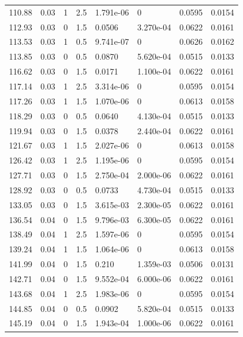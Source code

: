 \documentclass[preview]{standalone}
\begin{document}
{{{\begin{tabular}{L{1.2cm}C{1.2cm} C{0.3cm}C{0.5cm} C{1.4cm}C{1.4cm} C{1.4cm}C{1.4cm}}
  110.88  &  0.03  & 1     & 2.5 &  1.791e-06  & 0  & 0.0595 &  0.0154   \\ 
  112.93  &  0.03  & 0     & 1.5 &  0.0506  & 3.270e-04  & 0.0622 &  0.0161   \\ 
  113.53  &  0.03  & 1     & 0.5 &  9.741e-07  & 0  & 0.0626 &  0.0162   \\ 
  113.85  &  0.03  & 0     & 0.5 &  0.0870  & 5.620e-04  & 0.0515 &  0.0133   \\ 
  116.62  &  0.03  & 0     & 1.5 &  0.0171  & 1.100e-04  & 0.0622 &  0.0161   \\ 
  117.14  &  0.03  & 1     & 2.5 &  3.314e-06  & 0  & 0.0595 &  0.0154   \\ 
  117.26  &  0.03  & 1     & 1.5 &  1.070e-06  & 0  & 0.0613 &  0.0158   \\ 
  118.29  &  0.03  & 0     & 0.5 &  0.0640  & 4.130e-04  & 0.0515 &  0.0133   \\ 
  119.94  &  0.03  & 0     & 1.5 &  0.0378  & 2.440e-04  & 0.0622 &  0.0161   \\ 
  121.67  &  0.03  & 1     & 1.5 &  2.027e-06  & 0  & 0.0613 &  0.0158   \\ 
  126.42  &  0.03  & 1     & 2.5 &  1.195e-06  & 0  & 0.0595 &  0.0154   \\ 
  127.71  &  0.03  & 0     & 1.5 &  2.750e-04  & 2.000e-06  & 0.0622 &  0.0161   \\ 
  128.92  &  0.03  & 0     & 0.5 &  0.0733  & 4.730e-04  & 0.0515 &  0.0133   \\ 
  133.05  &  0.03  & 0     & 1.5 &  3.615e-03  & 2.300e-05  & 0.0622 &  0.0161   \\ 
  136.54  &  0.04  & 0     & 1.5 &  9.796e-03  & 6.300e-05  & 0.0622 &  0.0161   \\ 
  138.49  &  0.04  & 1     & 2.5 &  1.597e-06  & 0  & 0.0595 &  0.0154   \\ 
  139.24  &  0.04  & 1     & 1.5 &  1.064e-06  & 0  & 0.0613 &  0.0158   \\ 
  141.99  &  0.04  & 0     & 1.5 &  0.210  & 1.359e-03  & 0.0506 &  0.0131   \\ 
  142.71  &  0.04  & 0     & 1.5 &  9.552e-04  & 6.000e-06  & 0.0622 &  0.0161   \\ 
  143.68  &  0.04  & 1     & 2.5 &  1.983e-06  & 0  & 0.0595 &  0.0154   \\ 
  144.85  &  0.04  & 0     & 0.5 &  0.0902  & 5.820e-04  & 0.0515 &  0.0133   \\ 
  145.19  &  0.04  & 0     & 1.5 &  1.943e-04  & 1.000e-06  & 0.0622 &  0.0161   \\ 

\end{tabular}}}}
\end{document}
